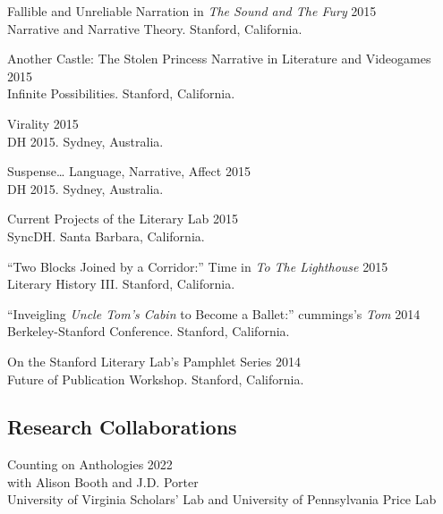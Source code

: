 \documentclass[
  12pt,
  letterpaper,
]{article}
\begin{document}
Fallible and Unreliable Narration in \emph{The Sound and The Fury}
\hfill 2015\\
\hspace*{0.333em} Narrative and Narrative Theory. Stanford, California.

Another Castle: The Stolen Princess Narrative in Literature and
Videogames \hfill 2015\\
\hspace*{0.333em} Infinite Possibilities. Stanford, California.

Virality \hfill 2015\\
\hspace*{0.333em} DH 2015. Sydney, Australia.

Suspense\ldots{} Language, Narrative, Affect \hfill 2015\\
\hspace*{0.333em} DH 2015. Sydney, Australia.

Current Projects of the Literary Lab \hfill 2015\\
\hspace*{0.333em} SyncDH. Santa Barbara, California.

``Two Blocks Joined by a Corridor:'' Time in \emph{To The Lighthouse}
\hfill 2015\\
\hspace*{0.333em} Literary History III. Stanford, California.

``Inveigling \emph{Uncle Tom's Cabin} to Become a Ballet:'' cummings's
\emph{Tom} \hfill 2014\\
\hspace*{0.333em} Berkeley-Stanford Conference. Stanford, California.

On the Stanford Literary Lab's Pamphlet Series \hfill 2014\\
\hspace*{0.333em} Future of Publication Workshop. Stanford, California.

\hypertarget{research-collaborations}{%
\subsection{Research Collaborations}\label{research-collaborations}}

Counting on Anthologies \hfill 2022\\
\hspace*{0.333em} with Alison Booth and J.D. Porter\\
\hspace*{0.333em} University of Virginia Scholars' Lab and University of
Pennsylvania Price Lab
\end{document}

